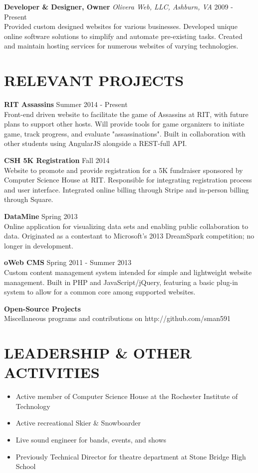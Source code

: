 \documentclass[line]{res}
\begin{document}
\begin{resume}
  \textbf{Developer \& Designer, Owner}
  \textit{Olivera Web, LLC, Ashburn, VA}
  \hfill
  2009 - Present\\
  Provided custom designed websites for various businesses.
  Developed unique online software solutions to simplify and automate pre-existing tasks.
  Created and maintain hosting services for numerous websites of varying technologies.

\section{RELEVANT PROJECTS}

  \textbf{RIT Assassins}
  \hfill
  Summer 2014 - Present
  \\
  Front-end driven website to facilitate the game of Assassins at RIT, with future plans to support other hosts.
  Will provide tools for game organizers to initiate game, track progress, and evaluate "assassinations". Built in collaboration with other students using AngularJS alongside a REST-full API.

  \textbf{CSH 5K Registration}
  \hfill
  Fall 2014
  \\
  Website to promote and provide registration for a 5K fundraiser sponsored by Computer Science House at RIT.
  Responsible for integrating registration process and user interface.
  Integrated online billing through Stripe and in-person billing through Square.

  \textbf{DataMine}
  \hfill
  Spring 2013
  \\
  Online application for visualizing data sets and enabling public collaboration to data.
  Originated as a contestant to Microsoft's 2013 DreamSpark competition; no longer in development.

  \textbf{oWeb CMS}
  \hfill
  Spring 2011 - Summer 2013
  \\
  Custom content management system intended for simple and lightweight website management.
  Built in PHP and JavaScript/jQuery, featuring a basic plug-in system to allow for a common core among supported websites.

  \textbf{Open-Source Projects}
  \\
  Miscellaneous programs and contributions on http://github.com/sman591

\section{LEADERSHIP \& OTHER ACTIVITIES}
  \begin{itemize}[leftmargin=10pt]
  \item Active member of Computer Science House at the Rochester Institute of Technology
    \item Active recreational Skier \& Snowboarder
    \item Live sound engineer for bands, events, and shows
    \item Previously Technical Director for theatre department at Stone Bridge High School
  \end{itemize}

\end{resume}
\end{document}

